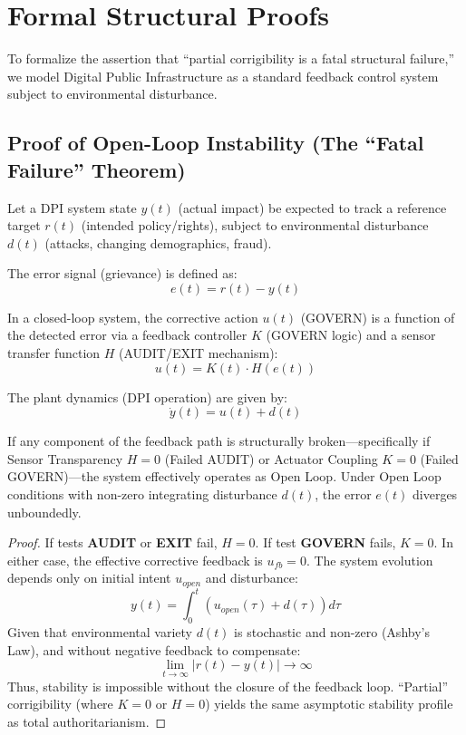 \section{Formal Structural Proofs}
\label{appendix:proofs}

To formalize the assertion that ``partial corrigibility is a fatal structural failure,'' we model Digital Public Infrastructure as a standard feedback control system subject to environmental disturbance.

\subsection{Proof of Open-Loop Instability (The ``Fatal Failure'' Theorem)}

Let a DPI system state $y(t)$ (actual impact) be expected to track a reference target $r(t)$ (intended policy/rights), subject to environmental disturbance $d(t)$ (attacks, changing demographics, fraud).

The error signal (grievance) is defined as:
\begin{equation}
e(t) = r(t) - y(t)
\end{equation}

In a closed-loop system, the corrective action $u(t)$ (GOVERN) is a function of the detected error via a feedback controller $K$ (GOVERN logic) and a sensor transfer function $H$ (AUDIT/EXIT mechanism):
\begin{equation}
u(t) = K(t) \cdot H(e(t))
\end{equation}

The plant dynamics (DPI operation) are given by:
\begin{equation}
\dot{y}(t) = u(t) + d(t)
\end{equation}

\begin{theorem}
If any component of the feedback path is structurally broken---specifically if Sensor Transparency $H=0$ (Failed AUDIT) or Actuator Coupling $K=0$ (Failed GOVERN)---the system effectively operates as Open Loop. Under Open Loop conditions with non-zero integrating disturbance $d(t)$, the error $e(t)$ diverges unboundedly.
\end{theorem}

\begin{proof}
If tests \textbf{AUDIT} or \textbf{EXIT} fail, $H=0$.
If test \textbf{GOVERN} fails, $K=0$.
In either case, the effective corrective feedback is $u_{fb} = 0$.
The system evolution depends only on initial intent $u_{open}$ and disturbance:
\begin{equation}
y(t) = \int_0^t (u_{open}(\tau) + d(\tau)) d\tau
\end{equation}
Given that environmental variety $d(t)$ is stochastic and non-zero (Ashby's Law), and without negative feedback to compensate:
\begin{equation}
\lim_{t \to \infty} |r(t) - y(t)| \to \infty
\end{equation}
Thus, stability is impossible without the closure of the feedback loop. ``Partial'' corrigibility (where $K=0$ or $H=0$) yields the same asymptotic stability profile as total authoritarianism.
\end{proof}

